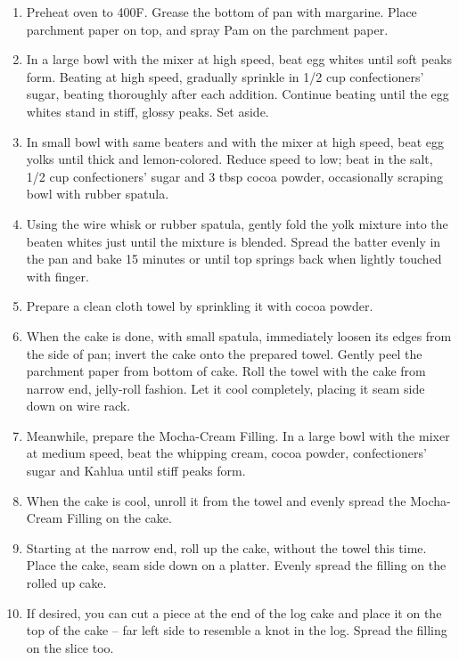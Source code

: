 \begin{enumerate}
    \item Preheat oven to 400\degree F. Grease the bottom of pan with margarine. Place parchment paper on top, and spray Pam on the parchment paper.
    \item In a large bowl with the mixer at high speed, beat egg whites until soft peaks form. Beating at high speed, gradually sprinkle in 1/2 cup confectioners’ sugar, beating thoroughly after each addition. Continue beating until the egg whites stand in stiff, glossy peaks. Set aside.
    \item In small bowl with same beaters and with the mixer at high speed, beat egg yolks until thick and lemon-colored. Reduce speed to low; beat in the salt, 1/2 cup confectioners’ sugar and 3 tbsp cocoa powder, occasionally scraping bowl with rubber spatula.
    \item Using the wire whisk or rubber spatula, gently fold the yolk mixture into the beaten whites just until the mixture is blended. Spread the batter evenly in the pan and bake 15 minutes or until top springs back when lightly touched with finger.
    \item Prepare a clean cloth towel by sprinkling it with cocoa powder.
    \item When the cake is done, with small spatula, immediately loosen its edges from the side of pan; invert the cake onto the prepared towel. Gently peel the parchment paper from bottom of cake. Roll the towel with the cake from narrow end, jelly-roll fashion. Let it cool completely, placing it seam side down on wire rack.
    \item Meanwhile, prepare the Mocha-Cream Filling. In a large bowl with the mixer at medium speed, beat the whipping cream, cocoa powder, confectioners’ sugar and Kahlua until stiff peaks form.
    \item When the cake is cool, unroll it from the towel and evenly spread the Mocha-Cream Filling on the cake.
    \item Starting at the narrow end, roll up the cake, without the towel this time. Place the cake, seam side down on a platter. Evenly spread the filling on the rolled up cake.
    \item If desired, you can cut a piece at the end of the log cake and place it on the top of the cake – far left side to resemble a knot in the log. Spread the filling on the slice too.
\end{enumerate}


